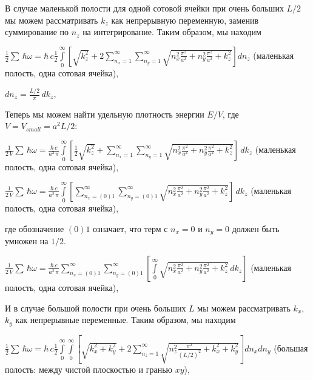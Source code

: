 \documentclass[11pt]{article}
\begin{document}
    В случае маленькой полости для одной сотовой ячейки при очень больших
\(L/2\) мы можем рассматривать \(k_z\) как непрерывную переменную,
заменив суммирование по \(n_z\) на интегрирование. Таким образом, мы
находим

    \(\frac{1}{2}\sum\,\hbar\omega = \hbar\,c\frac{1}{2}\int\limits_{0}^{\infty}\left[{\sqrt{k_z^2}+2\sum\limits_{n_x=1}^{\infty}\sum\limits_{n_y=1}^{\infty}\sqrt{n_x^2\frac{\pi^2}{a^2}+n_y^2\frac{\pi^2}{a^2}+k_z^2}}\right]d{n_z}\)
(маленькая полость, одна сотовая ячейка),

    \(dn_z = \frac{L/2}{\pi}\,dk_z\),

    Теперь мы можем найти удельную плотность энергии \(E/V\), где
\(V = V_{small} = a^2 L/2\):


    \(\frac{1}{2\,V}\sum\,\hbar\omega = \frac{\hbar\,c}{a^2\,\pi}\int\limits_{0}^{\infty}\left[{\frac{1}{2}\sqrt{k_z^2}+\sum\limits_{n_x=1}^{\infty}\sum\limits_{n_y=1}^{\infty}\sqrt{n_x^2\frac{\pi^2}{a^2}+n_y^2\frac{\pi^2}{a^2}+k_z^2}}\right]\,dk_z\)
(маленькая полость, одна сотовая ячейка),

    \(\frac{1}{2\,V}\sum\,\hbar\omega = \frac{\hbar\,c}{a^2\,\pi}\int\limits_{0}^{\infty}\left[{\sum\limits_{n_x=(0)1}^{\infty}\sum\limits_{n_y=(0)1}^{\infty}\sqrt{n_x^2\frac{\pi^2}{a^2}+n_y^2\frac{\pi^2}{a^2}+k_z^2}}\right]\,dk_z\)
(маленькая полость, одна сотовая ячейка),

    где обозначение \(\left(0\right) 1\) означает, что терм с \(n_x = 0\) и
\(n_y = 0\) должен быть умножен на \(1\big/2\).

    \(\frac{1}{2\,V}\sum\,\hbar\omega = \frac{\hbar\,c}{a^2\,\pi}\sum\limits_{n_x=(0)1}^{\infty}\sum\limits_{n_y=(0)1}^{\infty}\left[\int\limits_{0}^{\infty}\sqrt{n_x^2\frac{\pi^2}{a^2}+n_y^2\frac{\pi^2}{a^2}+k_z^2}\,dk_z\right]\)
(маленькая полость, одна сотовая ячейка),

    И в случае большой полости при очень больших \(L\) мы можем
рассматривать \(k_x\), \(k_y\) как непрерывные переменные. Таким
образом, мы находим

    \(\frac{1}{2}\sum\,\hbar\omega = \hbar\,c\frac{1}{2}\int\limits_{0}^{\infty}\int\limits_{0}^{\infty}\left[{\sqrt{k_x^2+k_y^2}+2\sum\limits_{n_z=1}^{\infty}\sqrt{n_z^2\frac{\pi^2}{(L/2)^2}+k_x^2+k_y^2}}\right]d{n_x}d{n_y}\)
(большая полость: между чистой плоскостью и гранью \(xy\)),
\end{document}

